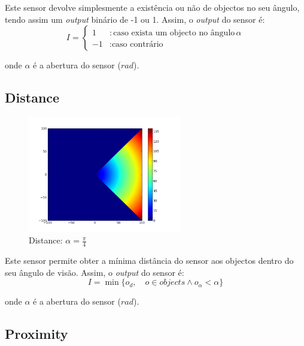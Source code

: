 \documentclass[a4paper]{article}
\begin{document}
\indent Este sensor devolve simplesmente a existência ou não de objectos no seu ângulo, tendo assim um \emph{output} binário de -1 ou 1.
Assim, o \emph{output} do sensor é:
\[
	I = \left\{
		\begin{array}{lr}
			1 & : \text{caso exista um objecto no ângulo}\, \alpha \\
			-1 & : \text{caso contrário}
		\end{array}
		\right.
\]

onde $\alpha$ é a abertura do sensor ($rad$).


\cleardoublepage
\subsection{Distance}

\begin{figure}[h]
	\vspace{-20pt}
	\begin{center}
		\includegraphics[width=0.6\textwidth]{graphs/sensors/distance.png}
	\end{center}
	\vspace{-20pt}
	\caption{Distance: $\alpha=\frac{\pi}{4}$}
\end{figure}

\indent Este sensor permite obter a mínima distância do sensor aos objectos dentro do seu ângulo de visão.
Assim, o \emph{output} do sensor é:
\[
	I = \min\{o_{d},\quad o \in objects \land o_{\alpha} < \alpha\}
\] 

onde $\alpha$ é a abertura do sensor ($rad$).

\cleardoublepage
\subsection{Proximity}
\end{document}
